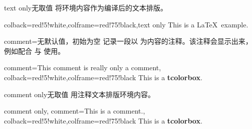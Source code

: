 \clearpage
\begin{docTcbKey}{text only}{}{无取值}
  将环境内容作为编译后的文本排版。
\begin{dispExample}
\begin{tcblisting}{colback=red!5!white,colframe=red!75!black,text only}
This is a \LaTeX\ example.
\end{tcblisting}
\end{dispExample}
\end{docTcbKey}



\begin{docTcbKey}{comment}{=}{无默认值，初始为空}
  记录一段以  为内容的注释。该注释会显示出来，
  例如配合  与  使用。
\begin{dispExample}
\begin{tcblisting}{comment={This comment is really only a comment},
  colback=red!5!white,colframe=red!75!black}
This is a \textbf{tcolorbox}.
\end{tcblisting}
\end{dispExample}
\end{docTcbKey}


\begin{docTcbKey}[][doc new=2014-11-17]{comment only}{}{无取值}
  用注释文本排版环境内容。
\begin{dispExample}
\begin{tcblisting}{comment only,
  comment={This is a comment.},
  colback=red!5!white,colframe=red!75!black}
This is a \textbf{tcolorbox}.
\end{tcblisting}
\end{dispExample}
\end{docTcbKey}





